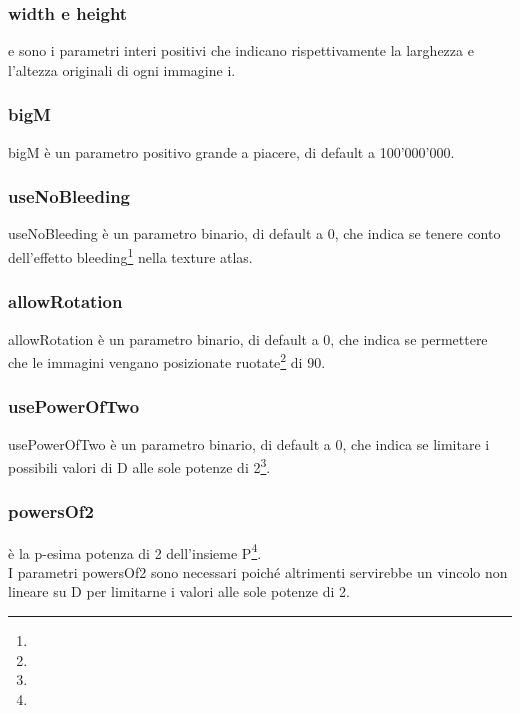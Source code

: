 \subsubsection{width e height}

\widthi{} e \heighti{} sono i parametri interi positivi che indicano rispettivamente la larghezza e l'altezza originali di ogni immagine i.

\subsubsection{bigM}
bigM è un parametro positivo grande a piacere, di default a 100’000’000. %

\subsubsection{useNoBleeding}
useNoBleeding è un parametro binario, di default a 0, che indica se tenere conto dell'effetto bleeding\footnote{\footBleeding} nella texture atlas. 

\subsubsection{allowRotation}
allowRotation è un parametro binario, di default a 0, che indica se permettere che le immagini vengano posizionate ruotate\footnote{\footRotation} di 90\degree.%


\subsubsection{usePowerOfTwo}
usePowerOfTwo è un parametro binario, di default a 0, che indica se limitare i possibili valori di D alle sole potenze di 2\footnote{\footTwoPowers}.

\subsubsection{powersOf2}
\powersOfTp{} è la p-esima potenza di 2 dell'insieme P\footnote{\footFreedom}. \\
I parametri powersOf2 sono necessari poiché altrimenti servirebbe un vincolo non lineare su D per limitarne i valori alle sole potenze di 2. \\






\newpage




